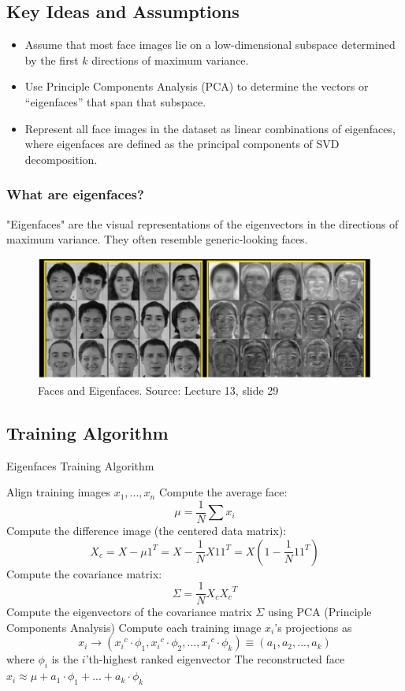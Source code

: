 \documentclass{article}
\begin{document}
\subsection{Key Ideas and Assumptions}
\begin{itemize}
  \item Assume that most face images lie on a low-dimensional subspace determined by the first $k$ directions of maximum variance.
  \item Use Principle Components Analysis (PCA) to determine the vectors or “eigenfaces” that span that subspace.
  \item Represent all face images in the dataset as linear combinations of eigenfaces, where eigenfaces are defined as the principal components of SVD decomposition.
\end{itemize}

\subsubsection{What are eigenfaces?}
"Eigenfaces" are the visual representations of the eigenvectors in the directions of maximum variance. They often resemble generic-looking faces.
\begin{figure}[h]
  \centering
  \includegraphics[width=\textwidth]{generic}
  \caption{Faces and Eigenfaces. Source: Lecture 13, slide 29}
\end{figure}

\subsection{Training Algorithm}
\begin{algorithm}[H]
\caption{Eigenfaces Training Algorithm \cite{eigenfaces}}\label{euclid}
\begin{algorithmic}[1]
\State Align training images $x_1, ..., x_n$
\State Compute the average face: 
$$\mu = \frac{1}{N}\sum x_i$$
\State Compute the difference image (the centered data matrix): 
$$X_c = X - \mu 1^{T} = X - \frac{1}{N}X11^{T} = X(1 - \frac{1}{N}11^{T})$$
\State Compute the covariance matrix:
$$\Sigma = \frac{1}{N}X_{c}{X_{c}}^T$$
\State Compute the eigenvectors of the covariance matrix $\Sigma$ using PCA (Principle Components Analysis)
\State Compute each training image $x_{i}$'s projections as 
$$x_i \rightarrow ({x_{i}}^{c} \cdot \phi_{1}, {x_{i}}^{c} \cdot \phi_{2}, ..., {x_{i}}^{c} \cdot \phi_{k}) \equiv (a_1, a_2, ..., a_k)$$
where $\phi_{i}$ is the $i$'th-highest ranked eigenvector
\State The reconstructed face $x_i \approx \mu + a_1 \cdot \phi_1 + ... + a_k \cdot \phi_k$
\end{algorithmic}
\end{algorithm}
\end{document}
